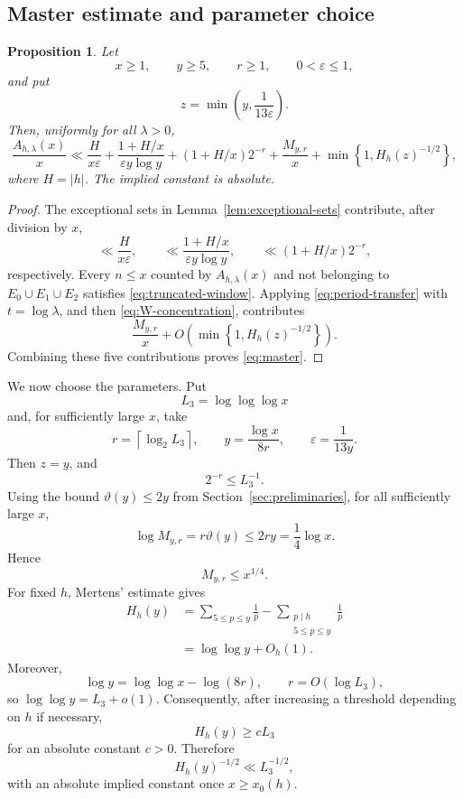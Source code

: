 \documentclass[11pt,reqno]{amsart}
\numberwithin{equation}{section}
\theoremstyle{plain}
\newtheorem{proposition}[theorem]{Proposition}
\theoremstyle{definition}
\theoremstyle{remark}
\begin{document}
\subsection{Master estimate and parameter choice}

\begin{proposition}\label{prop:master}
Let
\[
x\ge1,\qquad
y\ge5,\qquad
r\ge1,\qquad
0<\varepsilon\le1,
\]
and put
\[
z=\min\left(y,\frac1{13\varepsilon}\right).
\]
Then, uniformly for all $\lambda>0$,
\begin{equation}\label{eq:master}
\frac{A_{h,\lambda}(x)}{x}
\ll
\frac{H}{x\varepsilon}
+
\frac{1+H/x}{\varepsilon y\log y}
+
(1+H/x)2^{-r}
+
\frac{M_{y,r}}{x}
+
\min\left\{1,H_h(z)^{-1/2}\right\},
\end{equation}
where $H=|h|$. The implied constant is absolute.
\end{proposition}
\begin{proof}
The exceptional sets in Lemma~\ref{lem:exceptional-sets} contribute, after division by $x$,
\[
\ll\frac{H}{x\varepsilon},
\qquad
\ll\frac{1+H/x}{\varepsilon y\log y},
\qquad
\ll(1+H/x)2^{-r},
\]
respectively. Every $n\le x$ counted by $A_{h,\lambda}(x)$ and not belonging to
$E_0\cup E_1\cup E_2$ satisfies \eqref{eq:truncated-window}. Applying \eqref{eq:period-transfer} with $t=\log\lambda$, and then \eqref{eq:W-concentration}, contributes
\[
\frac{M_{y,r}}x
+
O\!\left(\min\left\{1,H_h(z)^{-1/2}\right\}\right).
\]
Combining these five contributions proves \eqref{eq:master}.
\end{proof}

We now choose the parameters. Put
\[
L_3=\log\log\log x
\]
and, for sufficiently large $x$, take
\begin{equation}\label{eq:parameters}
r=\left\lceil\log_2L_3\right\rceil,
\qquad
y=\frac{\log x}{8r},
\qquad
\varepsilon=\frac1{13y}.
\end{equation}
Then $z=y$, and
\begin{equation}\label{eq:two-r}
2^{-r}\le L_3^{-1}.
\end{equation}
Using the bound $\vartheta(y)\le2y$ from Section~\ref{sec:preliminaries}, for all sufficiently large $x$,
\[
\log M_{y,r}=r\vartheta(y)\le2ry=\frac14\log x.
\]
Hence
\begin{equation}\label{eq:M-bound}
M_{y,r}\le x^{1/4}.
\end{equation}
For fixed $h$, Mertens' estimate gives
\[
\begin{aligned}
H_h(y)
&=\sum_{5\le p\le y}\frac1p-\sum_{\substack{p\mid h\\5\le p\le y}}\frac1p\\
&=\log\log y+O_h(1).
\end{aligned}
\]
Moreover,
\[
\log y=\log\log x-\log(8r),
\qquad
r=O(\log L_3),
\]
so $\log\log y=L_3+o(1)$. Consequently, after increasing a threshold depending on $h$ if necessary,
\begin{equation}\label{eq:H-lower}
H_h(y)\ge cL_3
\end{equation}
for an absolute constant $c>0$. Therefore
\begin{equation}\label{eq:H-upper}
H_h(y)^{-1/2}\ll L_3^{-1/2},
\end{equation}
with an absolute implied constant once $x\ge x_0(h)$.
\end{document}
